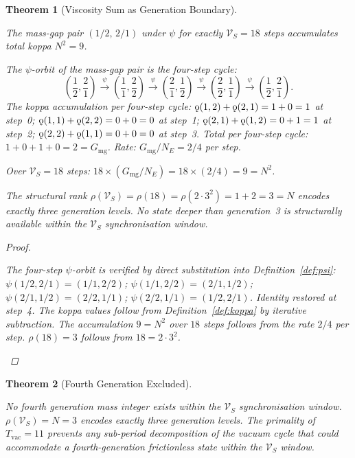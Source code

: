 \documentclass[11pt,letterpaper]{article}
\theoremstyle{plain}
\newtheorem{theorem}{Theorem}[section]
\theoremstyle{definition}
\theoremstyle{remark}
\newcommand{\rank}{\rho}
\newcommand{\koppa}{\mathbin{\text{\rm\k{o}}}}
\newcommand{\VS}{\mathcal{V}_S}
\newcommand{\Gmg}{G_{\mathrm{mg}}}
\newcommand{\Tvac}{T_{\mathrm{vac}}}
\begin{document}
\begin{theorem}[Viscosity Sum as Generation Boundary]\label{thm:vs}
\begin{rsbox}
The mass-gap pair $(1/2,\,2/1)$ under $\psi$ for exactly $\VS=18$
steps accumulates total koppa $N^2=9$.

The $\psi$-orbit of the mass-gap pair is the four-step cycle:
\[
\left(\frac{1}{2},\frac{2}{1}\right)\xrightarrow{\psi}
\left(\frac{1}{1},\frac{2}{2}\right)\xrightarrow{\psi}
\left(\frac{2}{1},\frac{1}{2}\right)\xrightarrow{\psi}
\left(\frac{2}{2},\frac{1}{1}\right)\xrightarrow{\psi}
\left(\frac{1}{2},\frac{2}{1}\right).
\]
The koppa accumulation per four-step cycle:
$\koppa(1,2)+\koppa(2,1)=1+0=1$ at step~0;
$\koppa(1,1)+\koppa(2,2)=0+0=0$ at step~1;
$\koppa(2,1)+\koppa(1,2)=0+1=1$ at step~2;
$\koppa(2,2)+\koppa(1,1)=0+0=0$ at step~3.
Total per four-step cycle: $1+0+1+0=2=\Gmg$.  Rate: $\Gmg/N_E=2/4$
per step.

Over $\VS=18$ steps: $18\times(\Gmg/N_E)=18\times(2/4)=9=N^2$.

The structural rank $\rank(\VS)=\rank(18)=\rank(2\cdot3^2)=1+2=3=N$
encodes exactly three generation levels.  No state deeper than
generation~3 is structurally available within the $\VS$
synchronisation window.
\end{rsbox}
\begin{proof}
\begin{rsbox}
The four-step $\psi$-orbit is verified by direct substitution into
Definition~\ref{def:psi}: $\psi(1/2,2/1)=(1/1,2/2)$;
$\psi(1/1,2/2)=(2/1,1/2)$; $\psi(2/1,1/2)=(2/2,1/1)$;
$\psi(2/2,1/1)=(1/2,2/1)$.  Identity restored at step~4.
The koppa values follow from Definition~\ref{def:koppa} by iterative
subtraction.  The accumulation $9=N^2$ over $18$ steps follows from
the rate $2/4$ per step.  $\rank(18)=3$ follows from $18=2\cdot3^2$.
\end{rsbox}
\end{proof}
\end{theorem}

\begin{theorem}[Fourth Generation Excluded]\label{thm:gen4}
\begin{rsbox}
No fourth generation mass integer exists within the $\VS$
synchronisation window.  $\rank(\VS)=N=3$ encodes exactly three
generation levels.  The primality of $\Tvac=11$ prevents any
sub-period decomposition of the vacuum cycle that could accommodate a
fourth-generation frictionless state within the $\VS$ window.
\end{rsbox}
\end{theorem}
\end{document}
